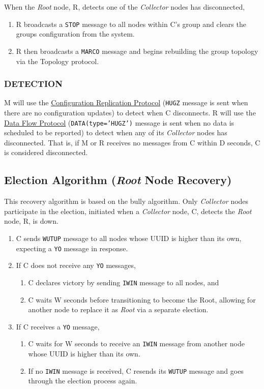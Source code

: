 When the \textit{Root} node, R, detects one of the \textit{Collector} nodes has disconnected,

\begin{enumerate}
\item R broadcasts a \texttt{STOP} message to all nodes within C's group and clears the groups configuration from the
      \dcamp system.
\item R then broadcasts a \texttt{MARCO} message and begins rebuilding the group topology via the Topology protocol.
\end{enumerate}

\subsubsection{DETECTION}

M will use the \hyperref[proto_config]{Configuration Replication Protocol} (\texttt{HUGZ} message is sent when there are
no configuration updates) to detect when C disconnects. R will use the \hyperref[proto_data]{Data Flow Protocol}
(\texttt{DATA(type='HUGZ')} message is sent when no data is scheduled to be reported) to detect when any of its
\textit{Collector} nodes has disconnected. That is, if M or R receives no messages from C within D seconds, C is
considered disconnected.

\subsection{Election Algorithm (\textit{Root} Node Recovery)}
\label{algor_elect}

This recovery algorithm is based on the bully algorithm\cite{needed}. Only \textit{Collector} nodes participate in the
election, initiated when a \textit{Collector} node, C, detects the \textit{Root} node, R, is down.

\begin{enumerate}
\item C sends \texttt{WUTUP} message to all nodes whose UUID is higher than its own, expecting a \texttt{YO} message in
      response.
\item If C does not receive any \texttt{YO} messages,
      \begin{enumerate}
      \item C declares victory by sending \texttt{IWIN} message to all nodes, and
      \item C waits W seconds before transitioning to become the Root, allowing for another node to replace it as
            \textit{Root} via a separate election.
      \end{enumerate}
\item If C receives a \texttt{YO} message,
      \begin{enumerate}
      \item C waits for W seconds to receive an \texttt{IWIN} message from another node whose UUID is higher than its
            own.
      \item If no \texttt{IWIN} message is received, C resends its \texttt{WUTUP} message and goes through the election
            process again.
      \end{enumerate}
\end{enumerate}

